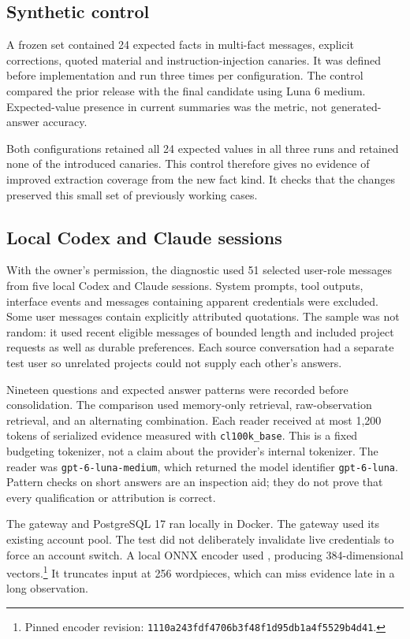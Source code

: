 \documentclass[11pt]{article}
\begin{document}
\subsection{Synthetic control}
A frozen set contained 24 expected facts in multi-fact messages, explicit corrections, quoted material and instruction-injection canaries. It was defined before implementation and run three times per configuration. The control compared the prior release with the final candidate using Luna 6 medium. Expected-value presence in current summaries was the metric, not generated-answer accuracy.

Both configurations retained all 24 expected values in all three runs and retained none of the introduced canaries. This control therefore gives no evidence of improved extraction coverage from the new fact kind. It checks that the changes preserved this small set of previously working cases.

\subsection{Local Codex and Claude sessions}
With the owner's permission, the diagnostic used 51 selected user-role messages from five local Codex and Claude sessions. System prompts, tool outputs, interface events and messages containing apparent credentials were excluded. Some user messages contain explicitly attributed quotations. The sample was not random: it used recent eligible messages of bounded length and included project requests as well as durable preferences. Each source conversation had a separate test user so unrelated projects could not supply each other's answers.

Nineteen questions and expected answer patterns were recorded before consolidation. The comparison used memory-only retrieval, raw-observation retrieval, and an alternating combination. Each reader received at most 1,200 tokens of serialized evidence measured with \texttt{cl100k\_base}. This is a fixed budgeting tokenizer, not a claim about the provider's internal tokenizer. The reader was \texttt{gpt-6-luna-medium}, which returned the model identifier \texttt{gpt-6-luna}. Pattern checks on short answers are an inspection aid; they do not prove that every qualification or attribution is correct.

The gateway and PostgreSQL 17 ran locally in Docker. The gateway used its existing account pool. The test did not deliberately invalidate live credentials to force an account switch. A local ONNX encoder used , producing 384-dimensional vectors.\footnote{Pinned encoder revision: \texttt{1110a243fdf4706b3f48f1d95db1a4f5529b4d41}.} It truncates input at 256 wordpieces, which can miss evidence late in a long observation.
\end{document}
